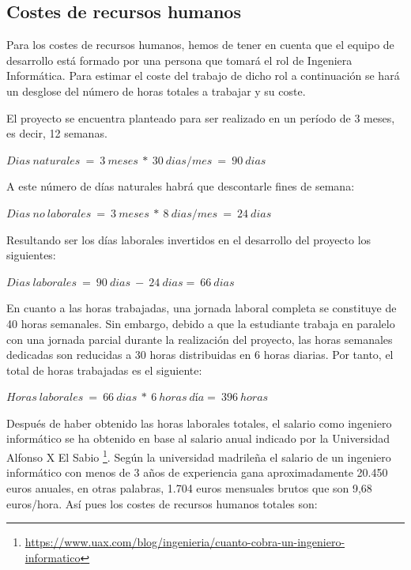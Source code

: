 \subsection{Costes de recursos humanos}
Para los costes de recursos humanos, hemos de tener en cuenta que el equipo de desarrollo está formado por una persona que tomará el rol de Ingeniera Informática. Para estimar el coste del trabajo de dicho rol a continuación se hará un desglose del número de horas totales a trabajar y su coste. \bigskip

El proyecto se encuentra planteado para ser realizado en un período de 3 meses, es decir, 12 semanas. 

\begin{center}
$Dias\ naturales\ =\ 3\ meses\ *\ 30\ dias / mes\ =\ 90\ dias$
\end{center}

A este número de días naturales habrá que descontarle fines de semana:

\begin{center}
$Dias\ no \ laborales\ =\ 3\ meses\ *\ 8\ dias / mes\ =\ 24\ dias$
\end{center}

Resultando ser los días laborales invertidos en el desarrollo del proyecto los siguientes:

\begin{center}
$Dias\ laborales\ =\ 90\ dias\ -\ 24\ dias =\ 66 \ dias$
\end{center}

En cuanto a las horas trabajadas, una jornada laboral completa se constituye de 40 horas semanales. Sin embargo, debido a que la estudiante trabaja en paralelo con una jornada parcial durante la realización del proyecto, las horas semanales dedicadas son reducidas a 30 horas distribuidas en 6 horas diarias. Por tanto, el total de horas trabajadas es el siguiente:

\begin{center}
$Horas\ laborales\ =\ 66\ dias\ *\ 6 \ horas\ día = \ 396 \ horas$
\end{center}

Después de haber obtenido las horas laborales totales, el salario como ingeniero informático se ha obtenido en base al salario anual indicado por la Universidad Alfonso X El Sabio \footnote{\url{https://www.uax.com/blog/ingenieria/cuanto-cobra-un-ingeniero-informatico}}. Según la universidad madrileña el salario de un ingeniero informático con menos de 3 años de experiencia gana aproximadamente 20.450 euros anuales, en otras palabras, 1.704 euros mensuales brutos que son 9,68 euros/hora. Así pues los costes de recursos humanos totales son:

